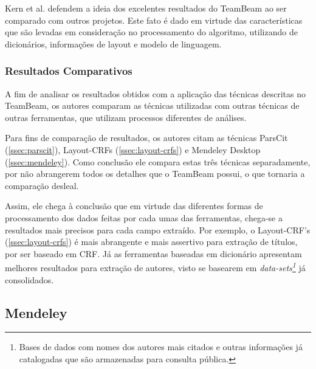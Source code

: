 Kern et al. defendem a ideia dos excelentes resultados do TeamBeam ao ser comparado com outros projetos. Este fato é dado em virtude das características que são levadas em consideração no processamento do algoritmo, utilizando de dicionários, informações de layout e modelo de linguagem.

\subsubsection{Resultados Comparativos}
\label{sssec:teambeam-comparative}

A fim de analisar os resultados obtidos com a aplicação das técnicas descritas no TeamBeam, os autores comparam as técnicas utilizadas com outras técnicas de outras ferramentas, que utilizam processos diferentes de análises.

Para fins de comparação de resultados, os autores citam as técnicas ParsCit (\autoref{ssec:parscit}), Layout-CRFs (\autoref{ssec:layout-crfs}) e Mendeley Desktop (\autoref{ssec:mendeley}). Como conclusão ele compara estas três técnicas separadamente, por não abrangerem todos os detalhes que o TeamBeam possui, o que tornaria a comparação desleal.

Assim, ele chega à conclusão que em virtude das diferentes formas de processamento dos dados feitas por cada umas das ferramentas, chega-se a resultados mais precisos para cada campo extraído. Por exemplo, o Layout-CRF's (\autoref{ssec:layout-crfs}) é mais abrangente e mais assertivo para extração de títulos, por ser baseado em CRF. Já as ferramentas baseadas em dicionário apresentam melhores resultados para extração de autores, visto se basearem em \textit{data-sets\footnote{Bases de dados com nomes dos autores mais citados e outras informações já catalogadas que são armazenadas para consulta pública.}} já consolidados.

\subsection{Mendeley}
\label{ssec:mendeley}

